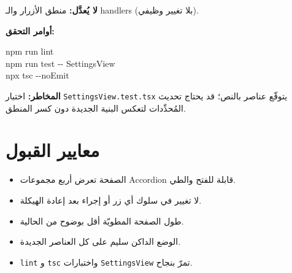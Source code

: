 \documentclass[11pt]{article}
\begin{document}
\textbf{لا يُعدَّل:} منطق الأزرار والـ handlers (بلا تغيير وظيفي).

\vspace{6pt}
\textbf{أوامر التحقق:}
\begin{tcolorbox}[colback=codebg, colframe=codebg, coltext=white, arc=3pt, left=8pt, right=8pt, top=6pt, bottom=6pt]
{\ttfamily\small\raggedleft
npm run lint\\
npm run test -{}- SettingsView\\
npx tsc -{}-noEmit
}
\end{tcolorbox}

\begin{warnbox}
\textbf{المخاطر:} اختبار \texttt{SettingsView.test.tsx} يتوقّع عناصر بالنص؛ قد يحتاج تحديث المُحدِّدات
لتعكس البنية الجديدة دون كسر المنطق.
\end{warnbox}

\section{معايير القبول}

\begin{itemize}
  \item[${\color{okgreen}\faCheckCircle}$] الصفحة تعرض أربع مجموعات Accordion قابلة للفتح والطي.
  \item[${\color{okgreen}\faCheckCircle}$] لا تغيير في سلوك أي زر أو إجراء بعد إعادة الهيكلة.
  \item[${\color{okgreen}\faCheckCircle}$] طول الصفحة المطويّة أقل بوضوح من الحالية.
  \item[${\color{okgreen}\faCheckCircle}$] الوضع الداكن سليم على كل العناصر الجديدة.
  \item[${\color{okgreen}\faCheckCircle}$] \texttt{lint} و \texttt{tsc} واختبارات \texttt{SettingsView} تمرّ بنجاح.
\end{itemize}
\end{document}
